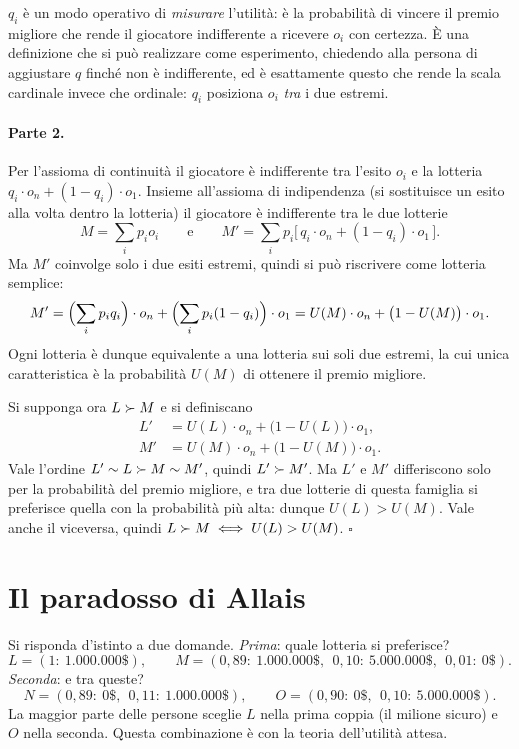 \begin{osservazione}
$q_i$ è un modo operativo di \emph{misurare} l'utilità: è la probabilità di vincere il
premio migliore che rende il giocatore indifferente a ricevere $o_i$ con certezza.
È una definizione che si può realizzare come esperimento, chiedendo alla persona
di aggiustare $q$ finché non è indifferente, ed è esattamente questo che rende la scala
cardinale invece che ordinale: $q_i$ posiziona $o_i$ \emph{tra} i due estremi.
\end{osservazione}

\paragraph{Parte 2.}
Per l'assioma di continuità il giocatore è indifferente tra l'esito $o_i$ e la lotteria
$q_i \cdot o_n + (1-q_i) \cdot o_1$. Insieme all'assioma di indipendenza (si sostituisce
un esito alla volta dentro la lotteria) il giocatore è indifferente tra le due lotterie
\[
  M = \sum_i p_i o_i
  \qquad\text{e}\qquad
  M' = \sum_i p_i \bigl[\,q_i \cdot o_n + (1-q_i)\cdot o_1\,\bigr].
\]
Ma $M'$ coinvolge solo i due esiti estremi, quindi si può riscrivere come lotteria semplice:
\[
  M' = \Bigl(\sum_i p_i q_i\Bigr)\cdot o_n + \Bigl(\sum_i p_i (1-q_i)\Bigr)\cdot o_1
     = U(M)\cdot o_n + \bigl(1 - U(M)\bigr)\cdot o_1 .
\]
Ogni lotteria è dunque equivalente a una lotteria sui soli due estremi, la cui unica
caratteristica è la probabilità $U(M)$ di ottenere il premio migliore.

Si supponga ora $L \succ M$ e si definiscano
\begin{align*}
  L' &= U(L)\cdot o_n + \bigl(1-U(L)\bigr)\cdot o_1,\\
  M' &= U(M)\cdot o_n + \bigl(1-U(M)\bigr)\cdot o_1 .
\end{align*}
Vale l'ordine $L' \sim L \succ M \sim M'$, quindi $L' \succ M'$. Ma $L'$ e $M'$
differiscono solo per la probabilità del premio migliore, e tra due lotterie di questa
famiglia si preferisce quella con la probabilità più alta: dunque $U(L) > U(M)$.
Vale anche il viceversa, quindi $L \succ M \iff U(L) > U(M)$. $\square$

\section{Il paradosso di Allais}

Si risponda d'istinto a due domande. \emph{Prima}: quale lotteria si preferisce?
\[
  L = (1{:}\ 1.000.000\$), \qquad
  M = (0{,}89{:}\ 1.000.000\$,\ \ 0{,}10{:}\ 5.000.000\$,\ \ 0{,}01{:}\ 0\$).
\]
\emph{Seconda}: e tra queste?
\[
  N = (0{,}89{:}\ 0\$,\ \ 0{,}11{:}\ 1.000.000\$), \qquad
  O = (0{,}90{:}\ 0\$,\ \ 0{,}10{:}\ 5.000.000\$).
\]
La maggior parte delle persone sceglie $L$ nella prima coppia (il milione sicuro) e $O$
nella seconda. Questa combinazione è  con la teoria dell'utilità attesa.

